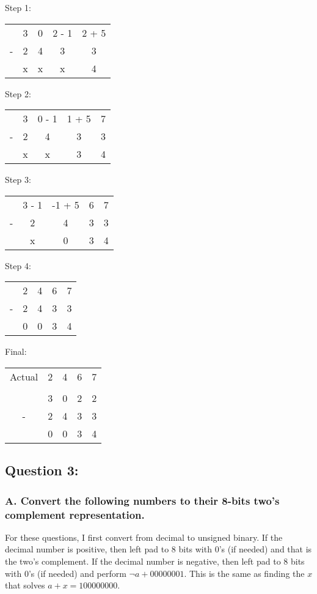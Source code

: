 \documentclass[12pt]{extreport}
\begin{document}
\begin{enumerate}
        \medskip

        Step 1:
        \begin{tabular}{ccccc}
            & 3& 0& 2 - 1& 2 + 5 \\
            - & 2& 4& 3& 3 \\
            \hline
            & x& x& x& 4
        \end{tabular}

        Step 2:
        \begin{tabular}{ccccc}
            & 3& 0 - 1& 1 + 5& 7 \\
            - & 2& 4& 3& 3 \\
            \hline
            & x& x& 3& 4
        \end{tabular}

        Step 3:
        \begin{tabular}{ccccc}
            & 3 - 1& -1 + 5& 6& 7 \\
            - & 2& 4& 3& 3 \\
            \hline
            & x& 0& 3& 4
        \end{tabular}

        Step 4:
        \begin{tabular}{ccccc}
            & 2& 4& 6& 7 \\
            - & 2& 4& 3& 3 \\
            \hline
            & 0& 0& 3& 4
        \end{tabular}

        Final:
        \begin{tabular}{ccccc}
            Actual & 2& 4& 6& 7 \\
            \\
            & 3& 0& 2& 2 \\
            - & 2& 4& 3& 3 \\
            \hline
            & 0& 0& 3& 4
        \end{tabular}

\end{enumerate}
\newpage

\subsection*{Question 3:}

\subsubsection{A. Convert the following numbers to their 8-bits two's complement representation.}
For these questions, I first convert from decimal to unsigned binary. If the decimal number is positive, then left pad to 8 bits with 0's (if needed) and that is the two's complement. If the decimal number is negative, then left pad to 8 bits with 0's (if needed) and perform \( \neg a + 00000001 \). This is the same as finding the \( x \) that solves \( a + x = 100000000 \).
\end{document}
